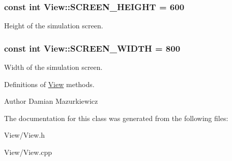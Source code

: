 \subsubsection[{S\+C\+R\+E\+E\+N\+\_\+\+H\+E\+I\+G\+H\+T}]{\setlength{\rightskip}{0pt plus 5cm}const int View\+::\+S\+C\+R\+E\+E\+N\+\_\+\+H\+E\+I\+G\+H\+T = 600\hspace{0.3cm}{\ttfamily [static]}}\label{class_view_a27d60d1f32f4f86745aedd73eecaaece}
Height of the simulation screen. \hypertarget{class_view_a49d4babbeaa66af838d11cb5139becca}{}
\subsubsection[{S\+C\+R\+E\+E\+N\+\_\+\+W\+I\+D\+T\+H}]{\setlength{\rightskip}{0pt plus 5cm}const int View\+::\+S\+C\+R\+E\+E\+N\+\_\+\+W\+I\+D\+T\+H = 800\hspace{0.3cm}{\ttfamily [static]}}\label{class_view_a49d4babbeaa66af838d11cb5139becca}
Width of the simulation screen.

Definitions of \hyperlink{class_view}{View} methods. \begin{DoxyAuthor}{Author}
Damian Mazurkiewicz 
\end{DoxyAuthor}


The documentation for this class was generated from the following files\+:\begin{DoxyCompactItemize}
\item 
View/View.\+h\item 
View/View.\+cpp\end{DoxyCompactItemize}
